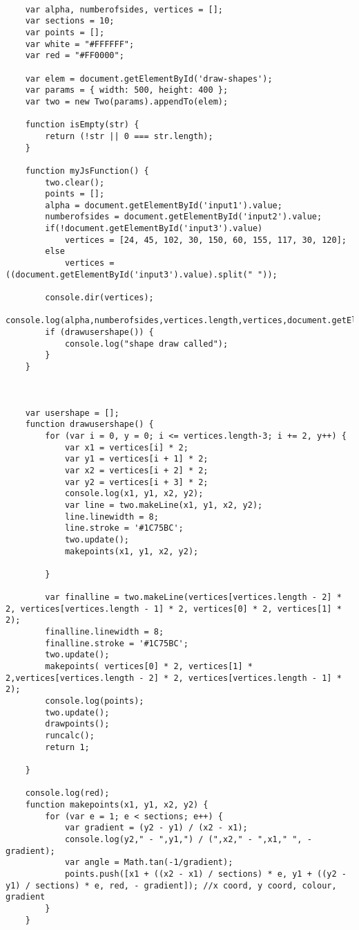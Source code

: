 \documentclass[letterpaper, 10 pt, conference]{ieeeconf}
\begin{document}
    \begin{lstlisting}[style=htmlcssjs]
    
    var alpha, numberofsides, vertices = [];
    var sections = 10;
    var points = [];
    var white = "#FFFFFF";
    var red = "#FF0000";
    
    var elem = document.getElementById('draw-shapes');
    var params = { width: 500, height: 400 };
    var two = new Two(params).appendTo(elem);
    
    function isEmpty(str) {
        return (!str || 0 === str.length);
    }
    
    function myJsFunction() {
        two.clear();
        points = [];
        alpha = document.getElementById('input1').value;
        numberofsides = document.getElementById('input2').value;
        if(!document.getElementById('input3').value)
            vertices = [24, 45, 102, 30, 150, 60, 155, 117, 30, 120];
        else
            vertices = ((document.getElementById('input3').value).split(" "));
        
        console.dir(vertices);
        console.log(alpha,numberofsides,vertices.length,vertices,document.getElementById('input3').value);
        if (drawusershape()) {
            console.log("shape draw called");
        }
    }
    
    
    
    var usershape = [];
    function drawusershape() {
        for (var i = 0, y = 0; i <= vertices.length-3; i += 2, y++) {
            var x1 = vertices[i] * 2;
            var y1 = vertices[i + 1] * 2;
            var x2 = vertices[i + 2] * 2;
            var y2 = vertices[i + 3] * 2;
            console.log(x1, y1, x2, y2);
            var line = two.makeLine(x1, y1, x2, y2);
            line.linewidth = 8;
            line.stroke = '#1C75BC';
            two.update();
            makepoints(x1, y1, x2, y2);
    
        }
    
        var finalline = two.makeLine(vertices[vertices.length - 2] * 2, vertices[vertices.length - 1] * 2, vertices[0] * 2, vertices[1] * 2);
        finalline.linewidth = 8;
        finalline.stroke = '#1C75BC';
        two.update();
        makepoints( vertices[0] * 2, vertices[1] * 2,vertices[vertices.length - 2] * 2, vertices[vertices.length - 1] * 2);
        console.log(points);
        two.update();
        drawpoints();
        runcalc();
        return 1;
    
    }
    
    console.log(red);
    function makepoints(x1, y1, x2, y2) {
        for (var e = 1; e < sections; e++) {
            var gradient = (y2 - y1) / (x2 - x1);
            console.log(y2," - ",y1,") / (",x2," - ",x1," ", -gradient);
            var angle = Math.tan(-1/gradient);
            points.push([x1 + ((x2 - x1) / sections) * e, y1 + ((y2 - y1) / sections) * e, red, - gradient]); //x coord, y coord, colour, gradient
        }
    }
    

\end{lstlisting}
\end{document}
